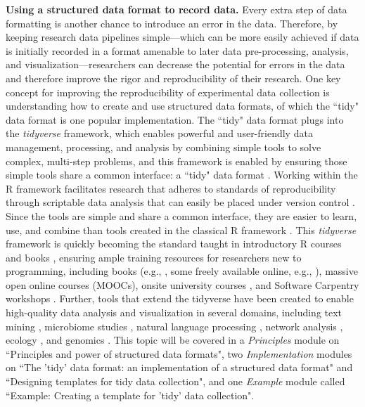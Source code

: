 \documentclass[pdftex,english,11pt,parskip=half]{scrartcl}
\begin{document}
\textbf{Using a structured data format to record data.} Every extra step of data formatting is another chance to introduce an error in the data. Therefore, by keeping research data pipelines simple---which can be more easily achieved if data is initially recorded in a format amenable to later data pre-processing, analysis, and visualization---researchers can decrease the potential for errors in the data and therefore improve the rigor and reproducibility of their research. One key concept for improving the reproducibility of experimental data collection is understanding how to create and use structured data formats, of which the ``tidy" data format is one popular implementation. The ``tidy" data format plugs into the \textit{tidyverse} framework, which enables powerful and user-friendly data management, processing, and analysis by combining simple tools to solve complex, multi-step problems, and this framework is enabled by ensuring those simple tools share a common interface: a ``tidy" data format \cite{ross2017declutter, silge2016tidytext, wickham2016ggplot2, wickham2016r}. Working within the R framework facilitates research that adheres to standards of reproducibility through scriptable data analysis that can easily be placed under version control \cite{bryan2017excuse}. Since the tools are simple and share a common interface, they are easier to learn, use, and combine than tools created in the classical R framework \cite{ross2017declutter, lowndes2017our, reviewer2017review, mcnamara2016state}. This \textit{tidyverse} framework is quickly becoming the standard taught in introductory R courses and books \cite{hicks2017guide, baumer2015data, kaplan2017teaching, stander2017enthusing, reviewer2017review, mcnamara2016state}, ensuring ample training resources for researchers new to programming, including books (e.g., \cite{baumer2017modern, lifesciencesR}, some freely available online, e.g., \cite{wickham2016r}), massive open online courses (MOOCs), onsite university courses \cite{baumer2015data, kaplan2017teaching, stander2017enthusing}, and Software Carpentry workshops \cite{wilson2014software, pawlik2017developing}. Further, tools that extend the tidyverse have been created to enable high-quality data analysis and visualization in several domains, including text mining \cite{silge2017text}, microbiome studies \cite{mcmurdie2013phyloseq}, natural language processing \cite{RJ-2017-035}, network analysis \cite{RJ-2017-023}, ecology \cite{hsieh2016inext}, and genomics \cite{yin2012ggbio}. This topic will be covered in a \textit{Principles} module on ``Principles and power of structured data formats", two \textit{Implementation} modules on ``The 'tidy' data format: an implementation of a structured data format" and ``Designing templates for tidy data collection", and one \textit{Example} module called ``Example: Creating a template for 'tidy' data collection".
\end{document}
